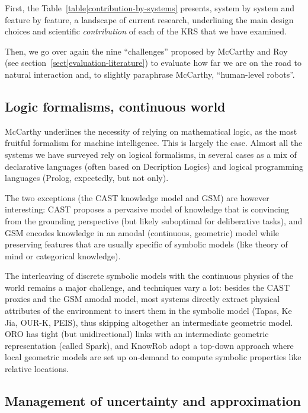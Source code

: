 \documentclass[journal]{IEEEtran}
\begin{document}
First, the Table~\ref{table|contribution-by-systems} presents, system by system
and feature by feature, a landscape of current research, underlining the main
design choices and scientific \emph{contribution} of each of the KRS that we
have examined.

Then, we go over again the nine ``challenges'' proposed by McCarthy and Roy (see
section~\ref{sect|evaluation-literature}) to evaluate how far we are on the road
to natural interaction and, to slightly paraphrase McCarthy, ``human-level
robots''.

\subsection{Logic formalisms, continuous world}

McCarthy underlines the necessity of relying on mathematical logic, as the most
fruitful formalism for machine intelligence. This is largely the case. Almost
all the systems we have surveyed rely on logical formalisms, in several cases
as a mix of declarative languages (often based on Decription Logics) and
logical programming languages (Prolog, expectedly, but not only).

The two exceptions (the CAST knowledge model and GSM) are however 
interesting: CAST proposes a pervasive model of knowledge that is convincing from
the grounding perspective (but likely suboptimal for deliberative tasks), and
GSM encodes knowledge in an amodal (continuous, geometric) model while
preserving features that are usually specific of symbolic models (like theory
of mind or categorical knowledge).

The interleaving of discrete symbolic models with the continuous physics of the
world remains a major challenge, and techniques vary a lot: besides the CAST
proxies and the GSM amodal model, most systems directly extract physical
attributes of the environment to insert them in the symbolic model ({\sc Tapas},
Ke Jia, OUR-K, PEIS), thus skipping altogether an intermediate geometric model.
ORO has tight (but unidirectional) links with an intermediate geometric
representation (called {\sc Spark}), and {\sc KnowRob} adopt a top-down approach
where local geometric models are set up on-demand to compute symbolic properties
like relative locations.

\subsection{Management of uncertainty and approximation}
\end{document}
